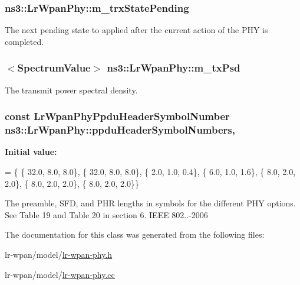 \subsubsection[{\texorpdfstring{m\+\_\+trx\+State\+Pending}{m_trxStatePending}}]{ ns3\+::\+Lr\+Wpan\+Phy\+::m\+\_\+trx\+State\+Pending\hspace{0.3cm}{\ttfamily [private]}}\hypertarget{classns3_1_1LrWpanPhy_a84647014f5242767e3358a6a851c81a7}{}\label{classns3_1_1LrWpanPhy_a84647014f5242767e3358a6a851c81a7}
The next pending state to applied after the current action of the P\+HY is completed. 
\subsubsection[{\texorpdfstring{m\+\_\+tx\+Psd}{m_txPsd}}]{$<${\bf Spectrum\+Value}$>$ ns3\+::\+Lr\+Wpan\+Phy\+::m\+\_\+tx\+Psd\hspace{0.3cm}{\ttfamily [private]}}\hypertarget{classns3_1_1LrWpanPhy_a136f3eddb97dc50b4689df6a36df1f76}{}\label{classns3_1_1LrWpanPhy_a136f3eddb97dc50b4689df6a36df1f76}
The transmit power spectral density. 
\subsubsection[{\texorpdfstring{ppdu\+Header\+Symbol\+Numbers}{ppduHeaderSymbolNumbers}}]{\setlength{\rightskip}{0pt plus 5cm}const {\bf Lr\+Wpan\+Phy\+Ppdu\+Header\+Symbol\+Number} ns3\+::\+Lr\+Wpan\+Phy\+::ppdu\+Header\+Symbol\+Numbers\hspace{0.3cm}{\ttfamily [static]}, {\ttfamily [protected]}}\hypertarget{classns3_1_1LrWpanPhy_add389321606b4a809e3f889ef7e97173}{}\label{classns3_1_1LrWpanPhy_add389321606b4a809e3f889ef7e97173}
{\bfseries Initial value\+:}
\begin{DoxyCode}
= \{ \{ 32.0, 8.0, 8.0\},
                                          \{ 32.0, 8.0, 8.0\},
                                          \{ 2.0, 1.0, 0.4\},
                                          \{ 6.0, 1.0, 1.6\},
                                          \{ 8.0, 2.0, 2.0\},
                                          \{ 8.0, 2.0, 2.0\},
                                          \{ 8.0, 2.0, 2.0\}\}
\end{DoxyCode}
The preamble, S\+FD, and P\+HR lengths in symbols for the different P\+HY options. See Table 19 and Table 20 in section 6. I\+E\+EE 802..-\/2006 

The documentation for this class was generated from the following files\+:\begin{DoxyCompactItemize}
\item 
lr-\/wpan/model/\hyperlink{lr-wpan-phy_8h}{lr-\/wpan-\/phy.\+h}\item 
lr-\/wpan/model/\hyperlink{lr-wpan-phy_8cc}{lr-\/wpan-\/phy.\+cc}\end{DoxyCompactItemize}
